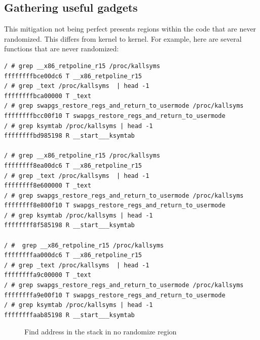 \documentclass{masterthesis}
\begin{document}
\subsection{Gathering useful gadgets}
This mitigation not being perfect presents regions within the code that are never randomized.
This differs from kernel to kernel. For example, here are several functions that are never randomized:
\begin{lstlisting}
/ # grep __x86_retpoline_r15 /proc/kallsyms
ffffffffbce00dc6 T __x86_retpoline_r15
/ # grep _text /proc/kallsyms  | head -1
ffffffffbca00000 T _text
/ # grep swapgs_restore_regs_and_return_to_usermode /proc/kallsyms 
ffffffffbcc00f10 T swapgs_restore_regs_and_return_to_usermode
/ # grep ksymtab /proc/kallsyms | head -1
ffffffffbd985198 R __start___ksymtab 

/ # grep __x86_retpoline_r15 /proc/kallsyms
ffffffff8ea00dc6 T __x86_retpoline_r15
/ # grep _text /proc/kallsyms  | head -1
ffffffff8e600000 T _text
/ # grep swapgs_restore_regs_and_return_to_usermode /proc/kallsyms 
ffffffff8e800f10 T swapgs_restore_regs_and_return_to_usermode
/ # grep ksymtab /proc/kallsyms | head -1
ffffffff8f585198 R __start___ksymtab

/ #  grep __x86_retpoline_r15 /proc/kallsyms
ffffffffaa000dc6 T __x86_retpoline_r15
/ # grep _text /proc/kallsyms  | head -1
ffffffffa9c00000 T _text
/ # grep swapgs_restore_regs_and_return_to_usermode /proc/kallsyms 
ffffffffa9e00f10 T swapgs_restore_regs_and_return_to_usermode
/ # grep ksymtab /proc/kallsyms | head -1
ffffffffaab85198 R __start___ksymtab
\end{lstlisting}

\begin{figure}[h!]
   \caption{Find address in the stack in no randomize region}
   \label{address_graphview}
\end{figure}
\end{document}
